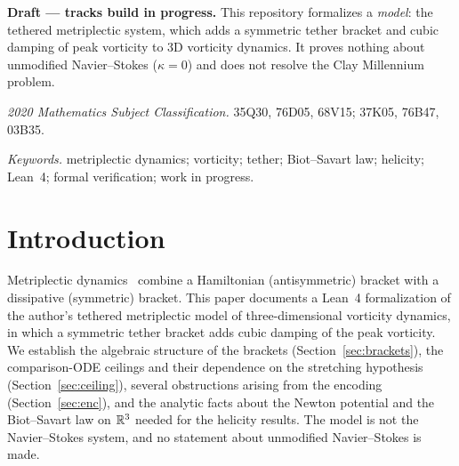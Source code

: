 \documentclass[11pt]{article}
\begin{document}

\begin{wipbox}
\textbf{Draft --- tracks build in progress.} This repository formalizes a \emph{model}: the tethered metriplectic system, which adds a symmetric tether bracket and cubic damping of peak vorticity to 3D vorticity dynamics. It proves nothing about unmodified Navier--Stokes ($\kappa=0$) and does not resolve the Clay Millennium problem.
\end{wipbox}

\begin{abstract}
We report a Lean~4/Mathlib~\cite{Lean4,Mathlib2020} formalization (0 \texttt{sorry}; axioms only , , ) of the author's tethered metriplectic model (in the sense of~\cite{Morrison1986}). Proved unconditionally: the unique antisymmetric/symmetric splitting of a bilinear bracket (); a non-circular canonicity theorem forcing the metric bracket to the form $c\ip{\Pi_u x,\Pi_u y}$ (); a uniform vorticity ceiling for the comparison inequality $M'\le CM^2-\kappa M^3$; a log-loss replacement for the stretching hypothesis giving a ceiling when $\kappa>4C_{\mathrm{abs}}$; several encoding counterexamples; the Newton-potential identity $\Delta(N\star g)=-4\pi g$ on $\R^3$ for $g\in C^2_c$; and $\curl\BS\,\omega=\omega$ for smooth, compactly supported, divergence-free $\omega$ (). Conditional and open items are listed by their exact Prop names.
\end{abstract}
\begin{mscblock}\textit{2020 Mathematics Subject Classification.} 35Q30, 76D05, 68V15; 37K05, 76B47, 03B35.\par
\textit{Keywords.} metriplectic dynamics; vorticity; tether; Biot--Savart law; helicity; Lean~4; formal verification; work in progress.
\end{mscblock}

\section{Introduction}
Metriplectic dynamics~\cite{Morrison1986} combine a Hamiltonian (antisymmetric) bracket with a dissipative (symmetric) bracket. This paper documents a Lean~4 formalization of the author's tethered metriplectic model of three-dimensional vorticity dynamics, in which a symmetric tether bracket adds cubic damping of the peak vorticity. We establish the algebraic structure of the brackets (Section~\ref{sec:brackets}), the comparison-ODE ceilings and their dependence on the stretching hypothesis (Section~\ref{sec:ceiling}), several obstructions arising from the encoding (Section~\ref{sec:enc}), and the analytic facts about the Newton potential and the Biot--Savart law on $\R^3$ needed for the helicity results. The model is not the Navier--Stokes system, and no statement about unmodified Navier--Stokes is made.
\end{document}
